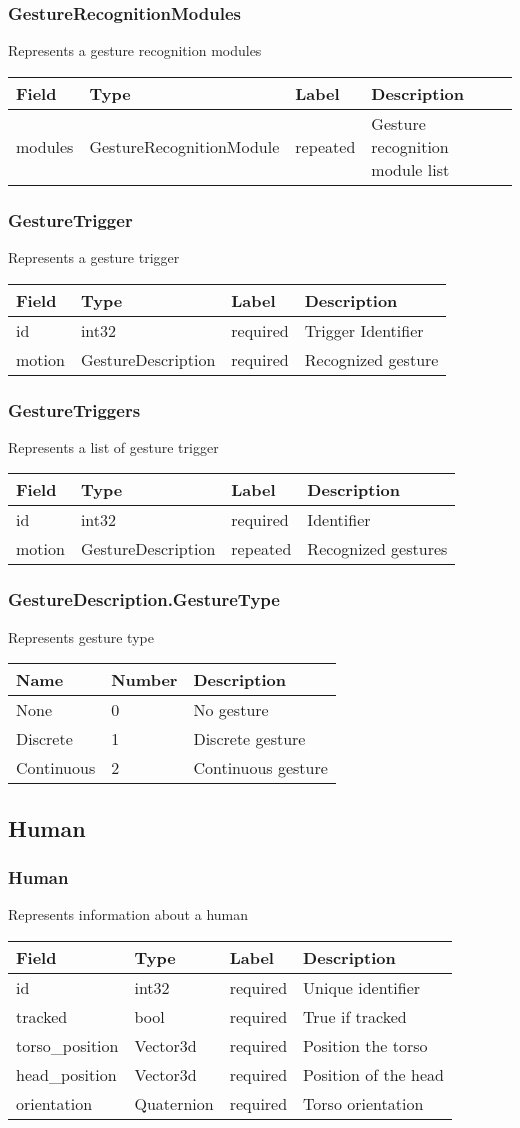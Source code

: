  \subsubsection*{GestureRecognitionModules} Represents a gesture recognition modules
\begin{longtable}[l]{@{}llll@{}}
\toprule
Field & Type & Label & Description\tabularnewline
\midrule
\endhead
modules & GestureRecognitionModule & repeated & Gesture recognition
module list\tabularnewline
\bottomrule
\end{longtable}
 \subsubsection*{GestureTrigger} Represents a gesture trigger
\begin{longtable}[l]{@{}llll@{}}
\toprule
Field & Type & Label & Description\tabularnewline
\midrule
\endhead
id & int32 & required & Trigger Identifier\tabularnewline
motion & GestureDescription & required & Recognized
gesture\tabularnewline
\bottomrule
\end{longtable}
\subsubsection*{GestureTriggers} Represents a list of gesture trigger
\begin{longtable}[l]{@{}llll@{}}
\toprule
Field & Type & Label & Description\tabularnewline
\midrule
\endhead
id & int32 & required & Identifier\tabularnewline
motion & GestureDescription & repeated & Recognized
gestures\tabularnewline
\bottomrule
\end{longtable}
 \subsubsection*{GestureDescription.GestureType} Represents gesture type
\begin{longtable}[l]{@{}lll@{}}
\toprule
Name & Number & Description\tabularnewline
\midrule
\endhead
None & 0 & No gesture\tabularnewline
Discrete & 1 & Discrete gesture\tabularnewline
Continuous & 2 & Continuous gesture\tabularnewline
\bottomrule
\end{longtable}
\subsection{Human}\label{human.proto}
\subsubsection*{Human} Represents information about a human
\begin{longtable}[l]{@{}llll@{}}
\toprule
Field & Type & Label & Description\tabularnewline
\midrule
\endhead
id & int32 & required & Unique identifier\tabularnewline
tracked & bool & required & True if tracked\tabularnewline
torso\_position & Vector3d & required & Position the
torso\tabularnewline
head\_position & Vector3d & required & Position of the
head\tabularnewline
orientation & Quaternion & required & Torso orientation\tabularnewline
\bottomrule
\end{longtable}
